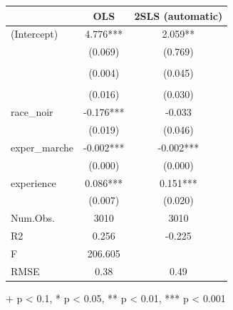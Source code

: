 \documentclass[
  letterpaper,
  DIV=11,
  numbers=noendperiod]{scrartcl}
\begin{document}
\begin{table}
\fontsize{12.0pt}{14.4pt}\selectfont
\begin{tabular*}{\linewidth}{@{\extracolsep{\fill}}lcc}
\toprule
  & OLS & 2SLS (automatic) \\ 
\midrule\addlinespace[2.5pt]
(Intercept) & 4.776*** & 2.059** \\ 
 & (0.069) & (0.769) \\ 
{\cellcolor[HTML]{FFFF33}{education}} & {\cellcolor[HTML]{FFFF33}{0.079***}} & {\cellcolor[HTML]{FFFF33}{0.236***}} \\ 
 & (0.004) & (0.045) \\ 
{\cellcolor[HTML]{FFFF33}{sud}} & {\cellcolor[HTML]{FFFF33}{-0.122***}} & {\cellcolor[HTML]{FFFF33}{-0.045}} \\ 
 & (0.016) & (0.030) \\ 
race\_noir & -0.176*** & -0.033 \\ 
 & (0.019) & (0.046) \\ 
exper\_marche & -0.002*** & -0.002*** \\ 
 & (0.000) & (0.000) \\ 
experience & 0.086*** & 0.151*** \\ 
{} & {(0.007)} & {(0.020)} \\ 
Num.Obs. & 3010 & 3010 \\ 
R2 & 0.256 & -0.225 \\ 
F & 206.605 &  \\ 
RMSE & 0.38 & 0.49 \\ 
\bottomrule
\end{tabular*}
\begin{minipage}{\linewidth}
+ p < 0.1, * p < 0.05, ** p < 0.01, *** p < 0.001\\
\end{minipage}
\end{table}
\end{document}
